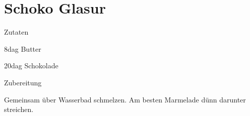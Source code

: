 \chapter*{Schoko Glasur}
\begin{multicols}{2}
 {\Large Zutaten}
 \begin{Zutaten}
		\item 8dag Butter
		\item 20dag Schokolade
		
\end{Zutaten}
	
\columnbreak
{}
\end{multicols}

{\Large Zubereitung} \newline
\begin{addmargin}[1cm]{0cm}
	Gemeinsam über Wasserbad schmelzen.\newline
	Am besten Marmelade dünn darunter streichen.
	
	
\end{addmargin}
